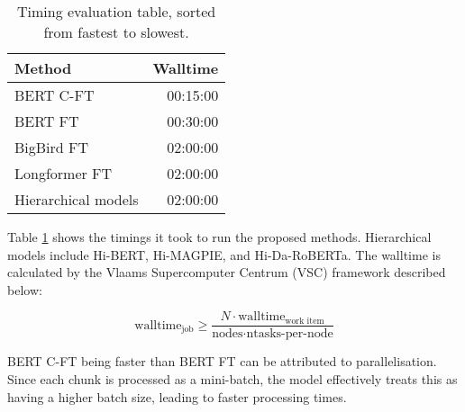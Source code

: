 \begin{table}[htbp]
    \centering
    \begin{tabular}{| l | r |}
        \hline                            \textbf{Method} & \textbf{Walltime} \\
        \hline
        BERT C-FT                                         & 00:15:00          \\
        \hline
        BERT FT                                           & 00:30:00          \\
        \hline
        BigBird FT                                        & 02:00:00          \\
        \hline
        Longformer FT                                     & 02:00:00          \\
        \hline
        Hierarchical models                               & 02:00:00          \\
        \hline
    \end{tabular}
    \caption{Timing evaluation table, sorted from fastest to slowest.}
    \label{table:eval_timings}
\end{table}

Table \ref{table:eval_timings} shows the timings it took to run the proposed methods. Hierarchical models include Hi-BERT, Hi-MAGPIE, and Hi-Da-RoBERTa. The walltime is calculated by the Vlaams Supercomputer Centrum (VSC) framework \cite{vscentrum} described below:

\[
    \text{walltime}_{\text{job}} \geq \frac{N \cdot \text{walltime}_{\text{work item}}}{\text{nodes} \cdot \text{ntasks-per-node}}
\]

BERT C-FT being faster than BERT FT can be attributed to parallelisation. Since each chunk is processed as a mini-batch, the model effectively treats this as having a higher batch size, leading to faster processing times.

